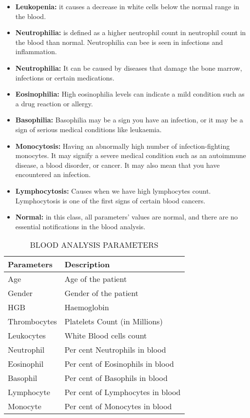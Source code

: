 \documentclass[twocolumn]{article}
\begin{document}
\begin{itemize}
\item\textbf{Leukopenia:} it causes a decrease in white cells below the normal range in the blood. 

\item\textbf{Neutrophilia:} is defined as a higher neutrophil count in neutrophil count in the blood than normal. Neutrophilia can bee is seen in infections and inflammation.

\item\textbf{Neutrophilia:} It can be caused by diseases that damage the bone marrow, infections or certain medications.

\item\textbf{Eosinophilia:} High eosinophilia levels can indicate a mild condition such as a drug reaction or allergy.

\item\textbf{Basophilia:} Basophilia may be a sign you have an infection, or it may be a sign of serious medical conditions like leukaemia. 

\item\textbf{Monocytosis:} Having an abnormally high number of infection-fighting monocytes. It may signify a severe medical condition such as an autoimmune disease, a blood disorder, or cancer. It may also mean that you have encountered an infection.\cite{Darcy2016}

\item\textbf{Lymphocytosis:} Causes when we have high lymphocytes count. Lymphocytosis is one of the first signs of certain blood cancers.

\item\textbf{Normal:} in this class, all parameters’ values are normal, and there are no essential notifications in the blood analysis.\cite{Jiang2011}

\end{itemize}

\begin{table*}[ht]
\centering
\begin{tabularx}{\textwidth}{|X|X|}
\hline
\textbf{Parameters} & \textbf{Description} \\
\hline
Age &Age of the patient \\
\hline
Gender& Gender of the patient \\
\hline
HGB&Haemoglobin\\
\hline
Thrombocytes& Platelets Count (in Millions) \\
\hline
Leukocytes& White Blood cells count \\
\hline
Neutrophil & Per cent Neutrophils in blood \\
\hline
Eosinophil & Per cent of Eosinophils in blood\\
\hline
Basophil &Per cent of Basophils in blood\\
\hline
Lymphocyte &Per cent of Lymphocytes in blood\\
\hline
Monocyte &Per cent of Monocytes in blood\\
\hline
\end{tabularx}
\caption{BLOOD ANALYSIS PARAMETERS}
\label{tab:example}
\end{table*}
\end{document}
